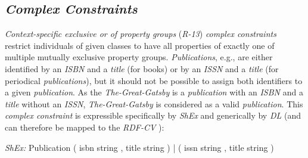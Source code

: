 \documentclass[a4paper,fontsize=11pt]{scrartcl}
\newcommand{\ms}[1]{\texttt{#1}}
\newenvironment{DL}{
  \vspace{0cm}
	\begin{center}
  \begin{tabular}{r l}

}{
  \end{tabular}
	\end{center}
}
\begin{document}
\subsection{\emph{Complex Constraints}}

\emph{Context-specific exclusive or of property groups} (\emph{R-13}) \emph{complex constraints}
restrict individuals of given classes to have all properties of exactly one of multiple mutually exclusive property groups.
\emph{Publications}, e.g., are either identified by an \emph{ISBN} and a \emph{title} (for books) or by an \emph{ISSN} and a \emph{title} (for periodical \emph{publications}), but it should not be possible to assign both identifiers to a given \emph{publication}. 
As the \emph{The-Great-Gatsby} is a \emph{publication} with an \emph{ISBN} and a \emph{title} without an \emph{ISSN}, 
\emph{The-Great-Gatsby} is considered as a valid \emph{publication}.
This \emph{complex constraint} is expressible specifically by \emph{ShEx} and generically by \emph{DL} (and can therefore be mapped to the \emph{RDF-CV} \cite{BoschEckert2015-2}):



\begin{ex}[commandchars=\\\{\}]
\textit{ShEx:} Publication { ( isbn string , title string ) | ( issn string , title string ) }
\end{ex}



\end{document}
